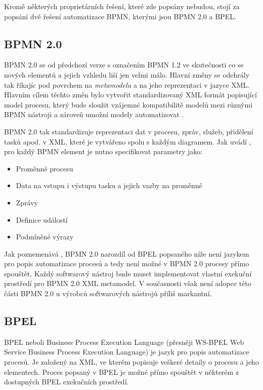 \documentclass[]{article}
\begin{document}
Kromě některých proprietárních řešení, které zde popsány nebudou, stojí za popsání dvě řešení automatizace BPMN, kterými jsou BPMN 2.0 a BPEL.

\subsection{BPMN 2.0}
BPMN 2.0 se od předchozí verze s označením BPMN 1.2 ve skutečnosti co se nových elementů a jejich vzhledu liší jen velmi málo. Hlavní změny se odehrály tak říkajíc pod povrchem na \textit{metamodelu} a na jeho reprezentaci v jazyce XML. Hlavním cílem těchto změn bylo vytvořit standardizovaný XML formát popisující model procesu, který bude sloužit vzájemné kompatibilitě modelů mezi různými BPMN nástroji a zároveň umožní modely automatizovat \cite{Silver2011}. 

BPMN 2.0 tak standardizuje reprezentaci dat v procesu, zpráv, služeb, přidělení tasků apod. v XML, které je vytvářeno spolu s každým diagramem. Jak uvádí \cite{Silver2011}, pro každý BPMN element je nutno specifikovat parametry jako:

\begin{itemize}
\item Proměnné procesu
\item Data na vstupu i výstupu tasku a jejich vazby na proměnné
\item Zprávy
\item Definice událostí
\item Podmíněné výrazy
\end{itemize}

Jak poznemenává \cite{Siver2011}, BPMN 2.0 narozdíl od BPEL popsaného níže není jazykem pro popis automatizace procesů a tedy není možné v BPMN 2.0 procesy přímo spouštět. Každý softwarový nástroj bude muset implementovat vlastní exekuční prostředí pro BPMN 2.0 XML metamodel. V současnosti však není adopce této části BPMN 2.0 u výrobců softwarových nástrojů příliš markantní. \cite{Silver20112}

\subsection{BPEL}
BPEL neboli Business Process Execution Language (přesněji WS-BPEL Web Service Business Process Execution Language) je jazyk pro popis automatizace procesů. Je založený na XML, ve kterém popisuje veškeré detaily o procesu a jeho elementech. Proces popsaný v BPEL je možné přímo spouštět v některém z dostupných BPEL exekučních prostředí.
\end{document}
